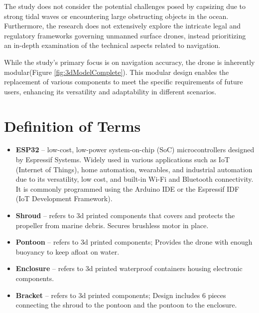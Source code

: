 The study does not consider the potential challenges posed by capsizing due to strong tidal waves or encountering large obstructing objects
in the ocean. Furthermore, the research does not extensively explore the intricate legal and regulatory frameworks governing unmanned surface 
drones, instead prioritizing an in-depth examination of the technical aspects related to navigation.

While the study’s primary focus is on navigation accuracy, the drone is inherently modular(Figure \ref{fig:3dModelComplete}). This modular 
design enables the replacement of various components to meet the specific requirements of future users, enhancing its versatility and 
adaptability in different scenarios.

\section{Definition of Terms}
\begin{itemize}
\item {\bf ESP32} -- low-cost, low-power system-on-chip (SoC) microcontrollers designed by Espressif Systems. Widely used in various applications such as 
IoT (Internet of Things), home automation, wearables, and industrial automation due to its versatility, low cost, and built-in Wi-Fi and Bluetooth
connectivity. It is commonly programmed using the Arduino IDE or the Espressif IDF (IoT Development Framework).
\item {\bf Shroud} -- refers to 3d printed components that covers and protects the propeller from marine debris. Secures brushless motor in place.
\item {\bf Pontoon} -- refers to 3d printed components; Provides the drone with enough buoyancy to keep afloat on water.
\item {\bf Enclosure} -- refers to 3d printed waterproof containers housing electronic components. 
\item {\bf Bracket} -- refers to 3d printed components; Design includes 6 pieces connecting the shroud to the pontoon and the pontoon to the enclosure.
\end{itemize}